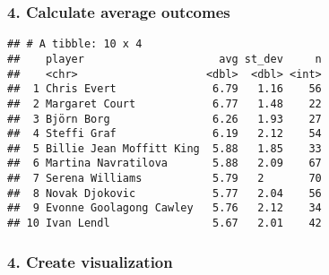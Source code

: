 \documentclass[]{article}
\newenvironment{Shaded}{\begin{snugshade}}{\end{snugshade}}
\newcommand{\KeywordTok}[1]{\textcolor[rgb]{0.13,0.29,0.53}{\textbf{#1}}}
\newcommand{\DataTypeTok}[1]{\textcolor[rgb]{0.13,0.29,0.53}{#1}}
\newcommand{\DecValTok}[1]{\textcolor[rgb]{0.00,0.00,0.81}{#1}}
\newcommand{\StringTok}[1]{\textcolor[rgb]{0.31,0.60,0.02}{#1}}
\newcommand{\OperatorTok}[1]{\textcolor[rgb]{0.81,0.36,0.00}{\textbf{#1}}}
\newcommand{\NormalTok}[1]{#1}
\begin{document}
\subsubsection{4. Calculate average
outcomes}\label{calculate-average-outcomes}

\begin{Shaded}
\end{Shaded}

\begin{verbatim}
## # A tibble: 10 x 4
##    player                     avg st_dev     n
##    <chr>                    <dbl>  <dbl> <int>
##  1 Chris Evert               6.79   1.16    56
##  2 Margaret Court            6.77   1.48    22
##  3 Björn Borg                6.26   1.93    27
##  4 Steffi Graf               6.19   2.12    54
##  5 Billie Jean Moffitt King  5.88   1.85    33
##  6 Martina Navratilova       5.88   2.09    67
##  7 Serena Williams           5.79   2       70
##  8 Novak Djokovic            5.77   2.04    56
##  9 Evonne Goolagong Cawley   5.76   2.12    34
## 10 Ivan Lendl                5.67   2.01    42
\end{verbatim}

\subsubsection{4. Create visualization}\label{create-visualization}
\end{document}

